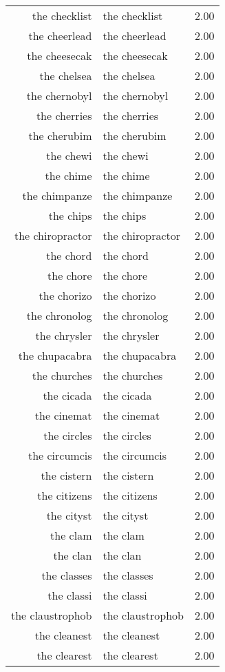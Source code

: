 \begin{table}[ht]
\begin{tabular}{rlr}
  the checklist & the checklist & 2.00 \\ 
  the cheerlead & the cheerlead & 2.00 \\ 
  the cheesecak & the cheesecak & 2.00 \\ 
  the chelsea & the chelsea & 2.00 \\ 
  the chernobyl & the chernobyl & 2.00 \\ 
  the cherries & the cherries & 2.00 \\ 
  the cherubim & the cherubim & 2.00 \\ 
  the chewi & the chewi & 2.00 \\ 
  the chime & the chime & 2.00 \\ 
  the chimpanze & the chimpanze & 2.00 \\ 
  the chips & the chips & 2.00 \\ 
  the chiropractor & the chiropractor & 2.00 \\ 
  the chord & the chord & 2.00 \\ 
  the chore & the chore & 2.00 \\ 
  the chorizo & the chorizo & 2.00 \\ 
  the chronolog & the chronolog & 2.00 \\ 
  the chrysler & the chrysler & 2.00 \\ 
  the chupacabra & the chupacabra & 2.00 \\ 
  the churches & the churches & 2.00 \\ 
  the cicada & the cicada & 2.00 \\ 
  the cinemat & the cinemat & 2.00 \\ 
  the circles & the circles & 2.00 \\ 
  the circumcis & the circumcis & 2.00 \\ 
  the cistern & the cistern & 2.00 \\ 
  the citizens & the citizens & 2.00 \\ 
  the cityst & the cityst & 2.00 \\ 
  the clam & the clam & 2.00 \\ 
  the clan & the clan & 2.00 \\ 
  the classes & the classes & 2.00 \\ 
  the classi & the classi & 2.00 \\ 
  the claustrophob & the claustrophob & 2.00 \\ 
  the cleanest & the cleanest & 2.00 \\ 
  the clearest & the clearest & 2.00 \\ 

\end{tabular}
\end{table}
